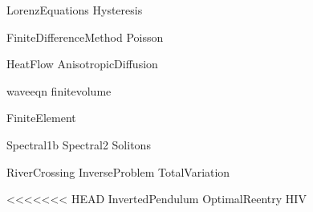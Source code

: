 \documentclass[nociteref]{SIAM-GH-book}
\begin{document}
{LorenzEquations}
{Hysteresis}

{FiniteDifferenceMethod}
{Poisson}

{HeatFlow}
{AnisotropicDiffusion}

{waveeqn}
{finitevolume}

{FiniteElement}

{Spectral1b}
{Spectral2}
{Solitons}

{RiverCrossing}
{InverseProblem}
{TotalVariation}

<<<<<<< HEAD
{InvertedPendulum}
{OptimalReentry}
{HIV}
\end{document}
